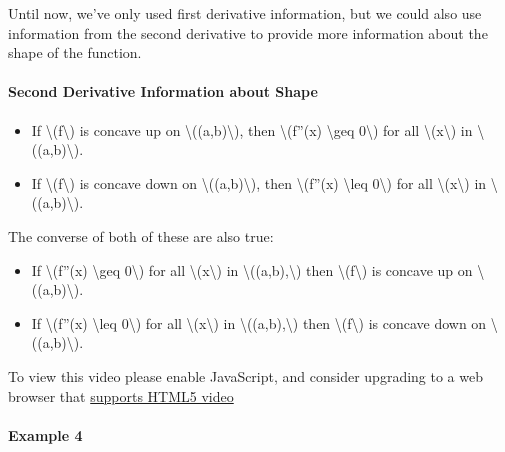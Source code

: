 Until now, we've only used first derivative information, but we could
also use information from the second derivative to provide more
information about the shape of the function.

\hypertarget{second-derivative-information-about-shape}{%
\paragraph{Second Derivative Information about
Shape}\label{second-derivative-information-about-shape}}

\begin{itemize}
\tightlist
\item
  If \textbackslash{}(f\textbackslash{}) is concave up on
  \textbackslash{}((a,b)\textbackslash{}), then \textbackslash{}(f''(x)
  \textbackslash{}geq 0\textbackslash{}) for all
  \textbackslash{}(x\textbackslash{}) in
  \textbackslash{}((a,b)\textbackslash{}).
\item
  If \textbackslash{}(f\textbackslash{}) is concave down on
  \textbackslash{}((a,b)\textbackslash{}), then \textbackslash{}(f''(x)
  \textbackslash{}leq 0\textbackslash{}) for all
  \textbackslash{}(x\textbackslash{}) in
  \textbackslash{}((a,b)\textbackslash{}).
\end{itemize}

The converse of both of these are also true:

\begin{itemize}
\tightlist
\item
  If \textbackslash{}(f''(x) \textbackslash{}geq 0\textbackslash{}) for
  all \textbackslash{}(x\textbackslash{}) in
  \textbackslash{}((a,b),\textbackslash{}) then
  \textbackslash{}(f\textbackslash{}) is concave up on
  \textbackslash{}((a,b)\textbackslash{}).
\item
  If \textbackslash{}(f''(x) \textbackslash{}leq 0\textbackslash{}) for
  all \textbackslash{}(x\textbackslash{}) in
  \textbackslash{}((a,b),\textbackslash{}) then
  \textbackslash{}(f\textbackslash{}) is concave down on
  \textbackslash{}((a,b)\textbackslash{}).
\end{itemize}

To view this video please enable JavaScript, and consider upgrading to a
web browser that \href{http://videojs.com/html5-video-support/}{supports
HTML5 video}

\hypertarget{example-4}{%
\paragraph{Example 4}\label{example-4}}

